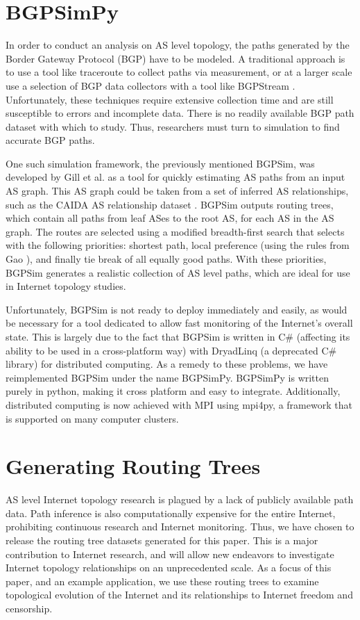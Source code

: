 \documentclass{article}
\begin{document}
\begin{multicols}{2}
\section{BGPSimPy}
In order to conduct an analysis on AS level topology, the paths
generated by the Border Gateway Protocol (BGP) have to be modeled. A
traditional approach is to use a tool like traceroute to collect paths via
measurement, or at a larger scale use a selection of BGP data collectors with
a tool like BGPStream \cite{bgpstream} \cite{traceroute}. Unfortunately, these
techniques require extensive collection time and are still susceptible to
errors and incomplete data. There is no readily available BGP path dataset
with which to study. Thus, researchers must turn to simulation to find
accurate BGP paths.     
\par One such simulation framework, the previously
mentioned BGPSim, was developed by Gill et al. \cite{quicksand} as a tool for
quickly estimating AS paths from an input AS graph. This AS graph could be
taken from a set of inferred AS relationships, such as the CAIDA AS
relationship dataset \cite{CAIDA}. BGPSim outputs routing trees, which contain
all paths from leaf ASes to the root AS, for each AS in the AS graph. The
routes are selected using a modified breadth-first search that selects with
the following priorities: shortest path, local preference (using the rules
from Gao \cite{Gao}), and finally tie break of all equally good paths. With
these priorities, BGPSim generates a realistic collection of AS level paths,
which are ideal for use in Internet topology studies.
\par 
Unfortunately, BGPSim is not ready to deploy immediately and easily, as would be necessary
for a tool dedicated to allow fast monitoring of the Internet's overall state.
This is largely due to the fact that BGPSim is written in C\# (affecting its
ability to be used in a cross-platform way) with DryadLinq (a deprecated C\#
library) for distributed computing. As a remedy to these problems, we have
reimplemented BGPSim under the name BGPSimPy. BGPSimPy is written purely in
python, making it cross platform and easy to integrate. Additionally,
distributed computing is now achieved with MPI using mpi4py, a framework that
is supported on many computer clusters.

\section{Generating Routing Trees}
AS level Internet topology research is plagued
by a lack of publicly available path data. Path inference is also
computationally expensive for the entire Internet, prohibiting continuous
research and Internet monitoring. Thus, we have chosen to release the routing
tree datasets generated for this paper. This is a major contribution to
Internet research, and will allow new endeavors to investigate Internet
topology relationships on an unprecedented scale. As a focus of this paper,
and an example application, we use these routing trees to examine topological
evolution of the Internet and its relationships to Internet freedom and
censorship.


\end{multicols}
\end{document}
